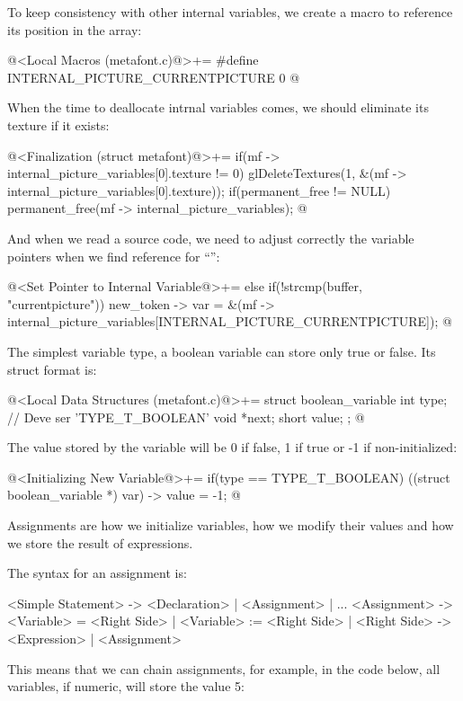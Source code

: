 To keep consistency with other internal variables, we create a macro
to reference its position in the array:

\iniciocodigo
@<Local Macros (metafont.c)@>+=
#define INTERNAL_PICTURE_CURRENTPICTURE 0
@
\fimcodigo

When the time to deallocate intrnal variables comes, we should
eliminate its texture if it exists:

\iniciocodigo
@<Finalization (struct metafont)@>+=
if(mf -> internal_picture_variables[0].texture != 0)
  glDeleteTextures(1, &(mf -> internal_picture_variables[0].texture));
if(permanent_free != NULL)
  permanent_free(mf -> internal_picture_variables);
@
\fimcodigo

And when we read a source code, we need to adjust correctly the
variable pointers when we find reference for
``'':

\iniciocodigo
@<Set Pointer to Internal Variable@>+=
else if(!strcmp(buffer, "currentpicture"))
  new_token -> var =
          &(mf -> internal_picture_variables[INTERNAL_PICTURE_CURRENTPICTURE]);
@
\fimcodigo


The simplest variable type, a boolean variable can store only true or
false. Its struct format is:

\iniciocodigo
@<Local Data Structures (metafont.c)@>+=
struct boolean_variable{
  int type; // Deve ser 'TYPE_T_BOOLEAN'
  void *next;
  short value;
};
@
\fimcodigo

The value stored by the variable will be 0 if false, 1 if true or -1
if non-initialized:

\iniciocodigo
@<Initializing New Variable@>+=
if(type == TYPE_T_BOOLEAN)
  ((struct boolean_variable *) var) -> value = -1;
@
\fimcodigo



Assignments are how we initialize variables, how we modify their
values and how we store the result of expressions.

The syntax for an assignment is:

\alinhaverbatim
<Simple Statement> -> <Declaration> | <Assignment> | ...
<Assignment> -> <Variable> = <Right Side> |
                <Variable> := <Right Side> |
<Right Side> -> <Expression> | <Assignment>
\alinhanormal

This means that we can chain assignments, for example, in the code
below, all variables, if numeric, will store the value 5:

